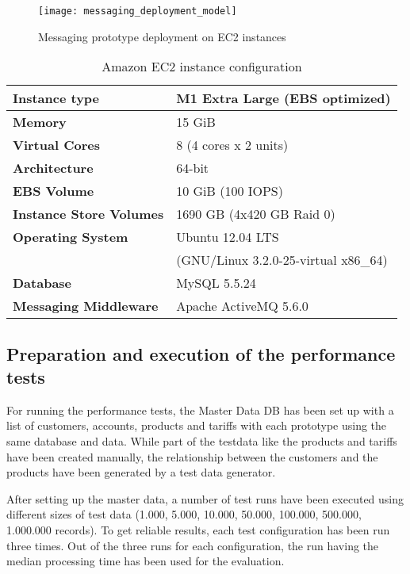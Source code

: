 \begin{figure}[htbp]
	\centering
	\texttt{[image: messaging\_deployment\_model]}
	\caption{Messaging prototype deployment on EC2 instances}
	\label{fig:ch4_messaging_deployment_model}
\end{figure}

\begin{table}[htbp]
	\renewcommand{\arraystretch}{1.3}
	\caption{Amazon EC2 instance configuration}
	\label{table:ch4_amazon_ec2}
	\centering
	\begin{tabular}{|l|p{3.5cm}|}
		\hline
		\bfseries Instance type & M1 Extra Large (EBS optimized)\\
		\hline
		\bfseries Memory & 15 GiB\\
		\hline
		\bfseries Virtual Cores & 8 (4 cores x 2 units)\\
		\hline
		\bfseries Architecture & 64-bit\\
		\hline
		\bfseries EBS Volume & 10 GiB (100 IOPS)\\
		\hline
		\bfseries Instance Store Volumes & 1690 GB (4x420 GB Raid 0)\\
		\hline
		\bfseries Operating System & Ubuntu 12.04 LTS\\
		& (GNU/Linux 3.2.0-25-virtual x86\_64)\\
		\hline 
		\bfseries Database & MySQL 5.5.24\\
		\hline
		\bfseries Messaging Middleware & Apache ActiveMQ 5.6.0\\
		\hline
	\end{tabular}
\end{table}

\subsection{Preparation and execution of the performance tests}
For running the performance tests, the Master Data DB has been set up with a list of customers, accounts, products and tariffs with each prototype using the same database and data. While part of the testdata like the products and tariffs have been created manually, the relationship between the customers and the products have been generated by a test data generator.

After setting up the master data, a number of test runs have been executed using different sizes of test data (1.000, 5.000, 10.000, 50.000, 100.000, 500.000, 1.000.000 records). To get reliable results, each test configuration has been run three times. Out of the three runs for each configuration, the run having the median processing time has been used for the evaluation.

